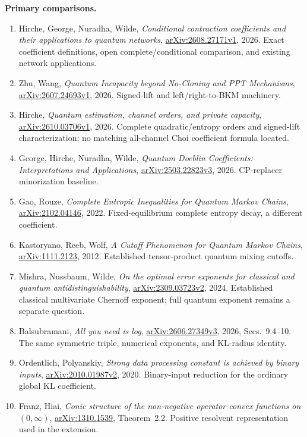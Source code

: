 \documentclass[10pt,a4paper]{article}
\begin{document}
\textbf{Primary comparisons.}\small\raggedright
\begin{enumerate}
\item Hirche, George, Nuradha, Wilde, \emph{Conditional contraction coefficients and their applications to quantum networks}, \href{https://arxiv.org/html/2608.27171v1}{arXiv:2608.27171v1}, 2026. Exact coefficient definitions, open complete/conditional comparison, and existing network applications.
\item Zhu, Wang, \emph{Quantum Incapacity beyond No-Cloning and PPT Mechanisms}, \href{https://arxiv.org/html/2607.24693v1}{arXiv:2607.24693v1}, 2026. Signed-lift and left/right-to-BKM machinery.
\item Hirche, \emph{Quantum estimation, channel orders, and private capacity}, \href{https://arxiv.org/html/2610.03706v1}{arXiv:2610.03706v1}, 2026. Complete quadratic/entropy orders and signed-lift characterization; no matching all-channel Choi coefficient formula located.
\item George, Hirche, Nuradha, Wilde, \emph{Quantum Doeblin Coefficients: Interpretations and Applications}, \href{https://arxiv.org/html/2503.22823v3}{arXiv:2503.22823v3}, 2026. CP-replacer minorization baseline.
\item Gao, Rouze, \emph{Complete Entropic Inequalities for Quantum Markov Chains}, \href{https://arxiv.org/abs/2102.04146}{arXiv:2102.04146}, 2022. Fixed-equilibrium complete entropy decay, a different coefficient.
\item Kastoryano, Reeb, Wolf, \emph{A Cutoff Phenomenon for Quantum Markov Chains}, \href{https://arxiv.org/abs/1111.2123}{arXiv:1111.2123}, 2012. Established tensor-product quantum mixing cutoffs.
\item Mishra, Nussbaum, Wilde, \emph{On the optimal error exponents for classical and quantum antidistinguishability}, \href{https://arxiv.org/html/2309.03723v2}{arXiv:2309.03723v2}, 2024. Established classical multivariate Chernoff exponent; full quantum exponent remains a separate question.
\item Balsubramani, \emph{All you need is log}, \href{https://arxiv.org/html/2606.27349v3}{arXiv:2606.27349v3}, 2026, Secs.~9.4--10. The same symmetric triple, numerical exponents, and KL-radius identity.
\item Ordentlich, Polyanskiy, \emph{Strong data processing constant is achieved by binary inputs}, \href{https://arxiv.org/abs/2010.01987v2}{arXiv:2010.01987v2}, 2020. Binary-input reduction for the ordinary global KL coefficient.
\item Franz, Hiai, \emph{Conic structure of the non-negative operator convex functions on $(0,\infty)$}, \href{https://arxiv.org/html/1310.1539}{arXiv:1310.1539}, Theorem~2.2. Positive resolvent representation used in the extension.

\end{enumerate}
\end{document}
